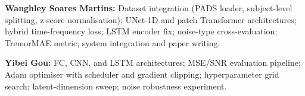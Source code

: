 \documentclass{article}
\begin{document}
\textbf{Wanghley Soares Martins:}
Dataset integration (PADS loader, subject-level splitting, z-score
normalisation); UNet-1D and patch Transformer architectures; hybrid
time-frequency loss; LSTM encoder fix; noise-type cross-evaluation;
TremorMAE metric; system integration and paper writing.

\textbf{Yibei Gou:}
FC, CNN, and LSTM architectures; MSE/SNR evaluation pipeline; Adam
optimiser with scheduler and gradient clipping; hyperparameter grid search;
latent-dimension sweep; noise robustness experiment.



\end{document}
